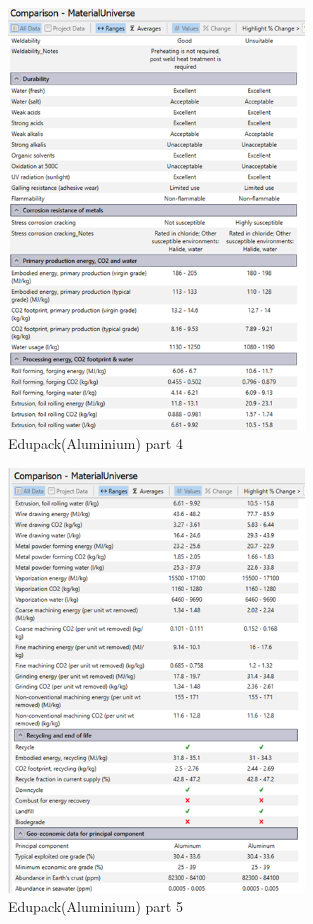             \begin{figure}[htbp]
                \centering
                \includegraphics[width=0.7\textwidth]{figures/Appendix-Mats/Fig4Alu.png}
                \caption*{Edupack(Aluminium) part 4} 
                \label{fig:Alu3}
                \end{figure}

                \begin{figure}[htbp]
                    \centering
                    \includegraphics[width=0.7\textwidth]{figures/Appendix-Mats/Fig5Alu.png}
                    \caption*{Edupack(Aluminium) part 5} 
                    \label{fig:Alu4}
                    \end{figure}

